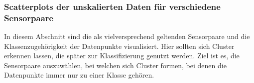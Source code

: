 \documentclass[11pt]{article}
\begin{document}
    \begin{center}
    \end{center}
    { \hspace*{\fill} \\}
    
    \begin{center}
    \end{center}
    { \hspace*{\fill} \\}
    
    \begin{center}
    \end{center}
    { \hspace*{\fill} \\}
    
    \hypertarget{scatterplots-der-unskalierten-daten-fuxfcr-verschiedene-sensorpaare}{%
\subsubsection*{Scatterplots der unskalierten Daten für verschiedene
Sensorpaare}\label{scatterplots-der-unskalierten-daten-fuxfcr-verschiedene-sensorpaare}}

    In diesem Abschnitt sind die als vielversprechend geltenden Sensorpaare
und die Klassenzugehörigkeit der Datenpunkte visualisiert. Hier sollten
sich Cluster erkennen lassen, die später zur Klassifizierung genutzt
werden. Ziel ist es, die Sensorpaare auszuwählen, bei welchen sich
Cluster formen, bei denen die Datenpunkte immer nur zu einer Klasse
gehören.
\end{document}
